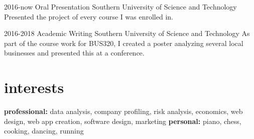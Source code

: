\documentclass[]{friggeri-cv-a4}
\begin{document}
\begin{entrylist}


\entry
{2016-now}
{Oral Presentation}
{Southern University of Science and Technology}
{Presented the project of every course I was enrolled in.}


\entry
{2016-2018}
{Academic Writing}
{Southern University of Science and Technology}
{As part of the course work for BUS320, I created a poster analyzing several local businesses and presented this at a conference.}


\end{entrylist}


\section{interests}

\textbf{professional:} data analysis, company profiling, risk analysis, economics, web design, web app creation, software design, marketing \textbf{personal:} piano, chess, cooking, dancing, running





\end{document}
